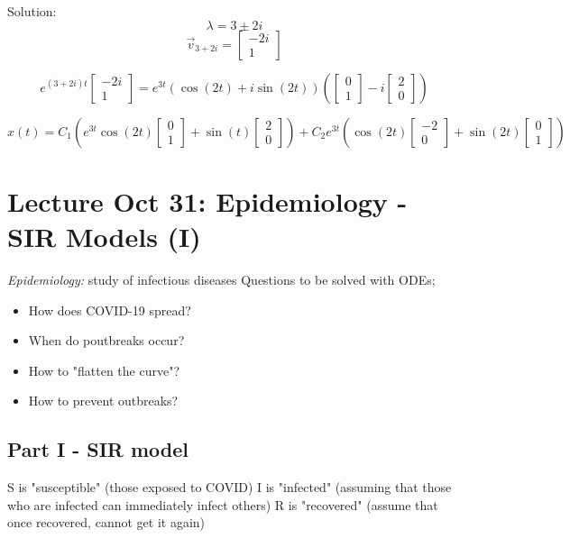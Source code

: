 \documentclass[12pt]{article}
\begin{document}
Solution:
\[\lambda = 3 \pm 2i\]
\[\vec{v}_{3 + 2i} = \begin{bmatrix}
    -2i\\
    1
\end{bmatrix}\] 

\[e^{(3 + 2i)t} \begin{bmatrix}
    -2i\\
    1
\end{bmatrix} = e^{3t} \left(\cos (2t) + i \sin (2t)\right) \left(\begin{bmatrix}
    0\\
    1
\end{bmatrix} - i \begin{bmatrix}
    2\\0
\end{bmatrix}\right)\]

\[x(t) = C_1 \left(e^{3t} \cos (2t) \begin{bmatrix}
    0\\1
\end{bmatrix} + \sin(t) \begin{bmatrix}
    2\\0
\end{bmatrix}\right) + C_2 e^{3t} \left(\cos(2t) \begin{bmatrix}
    -2\\
    0
\end{bmatrix} + \sin (2t) \begin{bmatrix}
    0\\1
\end{bmatrix}\right)\]

\section{Lecture Oct 31: Epidemiology - SIR Models (I)}
\emph{Epidemiology:} study of infectious diseases 
Questions to be solved with ODEs;
\begin{itemize}
    \item How does COVID-19 spread?
    \item When do poutbreaks occur?
    \item How to "flatten the curve"?
    \item How to prevent outbreaks?
\end{itemize}

\subsection*{Part I - SIR model}
S is "susceptible" (those exposed to COVID)
I is "infected" (assuming that those who are infected can immediately infect others)
R is "recovered" (assume that once recovered, cannot get it again)
\end{document}
